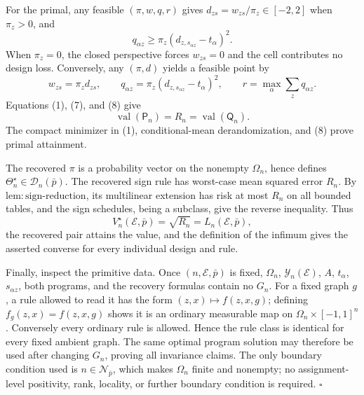 For the primal, any feasible \((\pi,w,q,r)\) gives \(d_{zs}=w_{zs}/\pi_z\in[-2,2]\) when \(\pi_z>0\), and
\[
 q_{\alpha z}\ge\pi_z(d_{z,s_{\alpha z}}-t_\alpha)^2. \tag{7}
\]
When \(\pi_z=0\), the closed perspective forces \(w_{zs}=0\) and the cell contributes no design loss. Conversely, any \((\pi,d)\) yields a feasible point by
\[
 w_{zs}=\pi_zd_{zs},\qquad
 q_{\alpha z}=\pi_z(d_{z,s_{\alpha z}}-t_\alpha)^2,
 \qquad
 r=\max_\alpha\sum_zq_{\alpha z}. \tag{8}
\]
Equations (1), (7), and (8) give
\[
 \operatorname{val}(\mathsf P_n)=R_n=\operatorname{val}(\mathsf Q_n). \tag{9}
\]
The compact minimizer in (1), conditional-mean derandomization, and (8) prove primal attainment.

The recovered \(\pi\) is a probability vector on the nonempty \(\Omega_n\), hence defines \(\Theta_n^\star\in\mathcal D_n(\bar p)\). The recovered sign rule has worst-case mean squared error \(R_n\). By \(\mathrm{lem{:}sign\text{-}reduction}\), its multilinear extension has risk at most \(R_n\) on all bounded tables, and the sign schedules, being a subclass, give the reverse inequality. Thus
\[
 V_n^\star(\mathcal E,\bar p)=\sqrt{R_n}
 =L_n(\mathcal E,\bar p),
\]
the recovered pair attains the value, and the definition of the infimum gives the asserted converse for every individual design and rule.

Finally, inspect the primitive data. Once \((n,\mathcal E,\bar p)\) is fixed, \(\Omega_n\), \(\mathcal Y_n(\mathcal E)\), \(A\), \(t_\alpha\), \(s_{\alpha z}\), both programs, and the recovery formulas contain no \(G_n\). For a fixed graph \(g\), a rule allowed to read it has the form \((z,x)\mapsto f(z,x,g)\); defining \(f_g(z,x)=f(z,x,g)\) shows it is an ordinary measurable map on \(\Omega_n\times[-1,1]^n\). Conversely every ordinary rule is allowed. Hence the rule class is identical for every fixed ambient graph. The same optimal program solution may therefore be used after changing \(G_n\), proving all invariance claims. The only boundary condition used is \(n\in\mathcal N_{\bar p}\), which makes \(\Omega_n\) finite and nonempty; no assignment-level positivity, rank, locality, or further boundary condition is required. \(\square\)